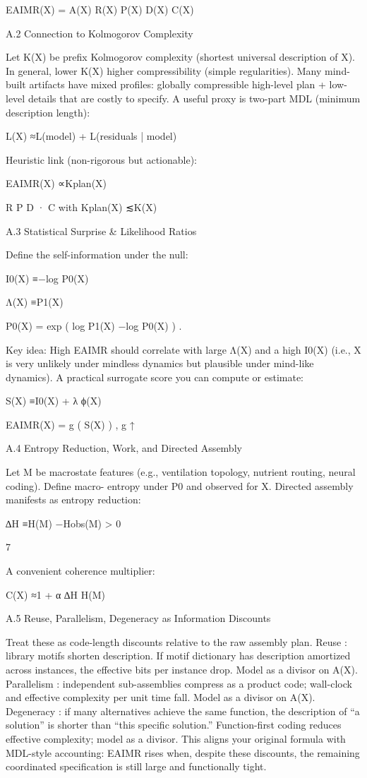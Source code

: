 \documentclass{article}
\begin{document}
EAIMR(X) =
A(X)
R(X) P(X) D(X) C(X)

A.2
Connection to Kolmogorov Complexity

Let K(X) be prefix Kolmogorov complexity (shortest universal description of X).
In general, lower K(X) higher compressibility (simple regularities).
Many mind-built artifacts have mixed profiles: globally compressible high-level plan + low-level details
that are costly to specify.
A useful proxy is two-part MDL (minimum description length):

L(X) ≈L(model) + L(residuals | model)

Heuristic link (non-rigorous but actionable):

EAIMR(X) ∝Kplan(X)

R P D
· C
with
Kplan(X) ≲K(X)

A.3
Statistical Surprise & Likelihood Ratios

Define the self-information under the null:

I0(X) ≡−log P0(X)

Λ(X) ≡P1(X)

P0(X) = exp
(
log P1(X) −log P0(X)
)
.

Key idea: High EAIMR should correlate with large Λ(X) and a high I0(X) (i.e., X is very unlikely under
mindless dynamics but plausible under mind-like dynamics).
A practical surrogate score you can compute or estimate:

S(X) ≡I0(X) + λ ϕ(X)

EAIMR(X) = g
(
S(X)
)
,
g ↑

A.4
Entropy Reduction, Work, and Directed Assembly

Let M be macrostate features (e.g., ventilation topology, nutrient routing, neural coding). Define macro-
entropy under P0 and observed for X.
Directed assembly manifests as entropy reduction:

∆H ≡H(M) −Hobs(M)
> 0

7

A convenient coherence multiplier:

C(X) ≈1 + α
∆H
H(M)

A.5
Reuse, Parallelism, Degeneracy as Information Discounts

Treat these as code-length discounts relative to the raw assembly plan.
Reuse : library motifs shorten description. If motif dictionary has description amortized across instances,
the effective bits per instance drop. Model as a divisor on A(X).
Parallelism : independent sub-assemblies compress as a product code; wall-clock and effective complexity
per unit time fall. Model as a divisor on A(X).
Degeneracy : if many alternatives achieve the same function, the description of “a solution” is shorter
than “this specific solution.” Function-first coding reduces effective complexity; model as a divisor.
This aligns your original formula with MDL-style accounting: EAIMR rises when, despite these discounts,
the remaining coordinated specification is still large and functionally tight.
\end{document}
